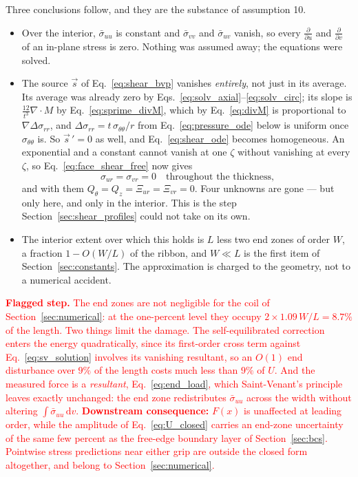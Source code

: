 \documentclass[11pt]{article}
\begin{document}
Three conclusions follow, and they are the substance of assumption 10.
\begin{itemize}
\item Over the interior, $\bar\sigma_{uu}$ is constant and $\bar\sigma_{vv}$ and
  $\bar\sigma_{uv}$ vanish, so every $\frac{\partial}{\partial u}$ and
  $\frac{\partial}{\partial v}$ of an in-plane stress is zero. Nothing was
  assumed away; the equations were solved.
\item The source $\vec s$ of Eq.~\eqref{eq:shear_bvp} vanishes \emph{entirely},
  not just in its average. Its average was already zero by
  Eqs.~\eqref{eq:solv_axial}--\eqref{eq:solv_circ}; its slope is
  $\frac{12}{t^{3}}\nabla\cdot M$ by Eq.~\eqref{eq:sprime_divM}, which by
  Eq.~\eqref{eq:divM} is proportional to $\nabla\Delta\sigma_{rr}$, and
  $\Delta\sigma_{rr} = t\,\sigma_{\theta\theta}/r$ from
  Eq.~\eqref{eq:pressure_ode} below is uniform once $\sigma_{\theta\theta}$ is.
  So $\vec s\,' = 0$ as well, and Eq.~\eqref{eq:shear_ode} becomes homogeneous.
  An exponential and a constant cannot vanish at one $\zeta$ without vanishing at
  every $\zeta$, so Eq.~\eqref{eq:face_shear_free} now gives
  \begin{equation}\label{eq:shears_zero}
      \boxed{\;\sigma_{ur} = \sigma_{vr} = 0
        \quad\text{throughout the thickness,}\;}
  \end{equation}
  and with them $Q_\theta = Q_z = \Xi_{ur} = \Xi_{vr} = 0$. Four unknowns are
  gone --- but only here, and only in the interior. This is the step
  Section~\ref{sec:shear_profiles} could not take on its own.
\item The interior extent over which this holds is $L$ less two end zones of
  order $W$, a fraction $1 - O\!\left(W/L\right)$ of the ribbon, and
  $W \ll L$ is the first item of Section~\ref{sec:constants}. The
  approximation is charged to the geometry, not to a numerical accident.
\end{itemize}

\medskip
\noindent\textcolor{red}{\textbf{Flagged step.} The end zones are not negligible
for the coil of Section~\ref{sec:numerical}: at the one-percent level they
occupy $2\times1.09\,W/L = 8.7\%$ of the length. Two things limit the damage.
The self-equilibrated correction enters the energy quadratically, since its
first-order cross term against Eq.~\eqref{eq:sv_solution} involves its
vanishing resultant, so an $O(1)$ end disturbance over $9\%$ of the length costs
much less than $9\%$ of $U$. And the measured force is a \emph{resultant},
Eq.~\eqref{eq:end_load}, which Saint-Venant's principle leaves exactly
unchanged: the end zone redistributes $\bar\sigma_{uu}$ across the width without
altering $\int\bar\sigma_{uu}\,\mathrm dv$. \textbf{Downstream consequence:}
$F(x)$ is unaffected at leading order, while the amplitude of
Eq.~\eqref{eq:U_closed} carries an end-zone uncertainty of the same few percent
as the free-edge boundary layer of Section~\ref{sec:bcs}. Pointwise stress
predictions near either grip are outside the closed form altogether, and belong
to Section~\ref{sec:numerical}.}
\medskip
\end{document}
